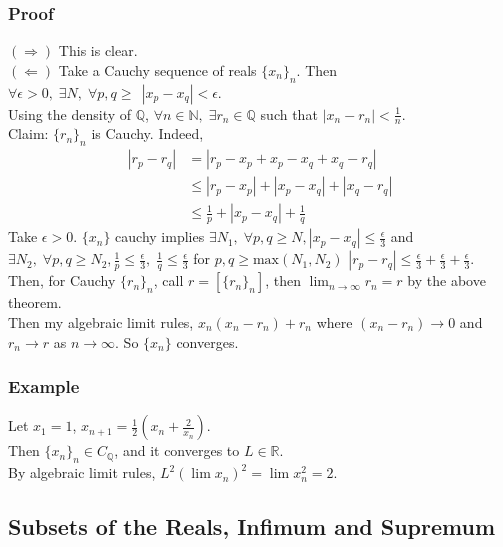 \documentclass[11pt]{article}
\newcommand{\0}{\emptyset}
\newcommand{\N}{\mathbb{N}}
\newcommand{\Q}{\mathbb{Q}}
\newcommand{\R}{\mathbb{R}}
\begin{document}
\subsubsection*{Proof}
\label{sec:org1667e9c}
\((\Longrightarrow)\) This is clear.\\[0pt]
\((\Longleftarrow)\) Take a Cauchy sequence of reals \(\{x_{n}\}_{n}\). Then \(\forall\epsilon>0,\;\exists N,\;\forall p,q\geq\,\;|x_{p}-x_{q}|<\epsilon\).\\[0pt]
Using the density of \(\Q\), \(\forall n\in\N,\;\exists r_{n}\in\Q\) such that \(|x_{n}-r_{n}|<\frac{1}{n}\).\\[0pt]
Claim: \(\{r_{n}\}_{n}\) is Cauchy. Indeed,\\[0pt]
\begin{align*}
  |r_{p}-r_{q}|
  &=|r_{p}-x_{p}+x_{p}-x_{q}+x_{q}-r_{q}|
  \\&\leq|r_{p}-x_{p}|+|x_{p}-x_{q}|+|x_{q}-r_{q}|
  \\&\leq\frac{1}{p} +|x_{p}-x_{q}|+\frac{1}{q}
\end{align*}
Take \(\epsilon>0\). \(\{x_{n}\}\) cauchy implies \(\exists N_{1},\;\forall p,q\geq N,|x_{p}-x_{q}|\leq\frac{\epsilon}{3}\) and \(\exists N_{2},\;\forall p,q\geq N_{2},\frac{1}{p}\leq\frac{\epsilon}{3},\;\frac{1}{q}\leq\frac{\epsilon}{3}\) for \(p,q\geq\text{max}(N_{1},N_{2})\) \(|r_{p}-r_{q}|\leq\frac{\epsilon}{3}+\frac{\epsilon}{3}+\frac{\epsilon}{3}\).\\[0pt]
Then, for Cauchy \(\{r_{n}\}_{n}\), call \(r=[\{r_{n}\}_{n}]\), then \(\lim_{n\to\infty}r_{n}=r\) by the above theorem.\\[0pt]
Then my algebraic limit rules, \(x_{n}(x_{n}-r_{n})+r_{n}\) where \((x_{n}-r_{n})\to 0\) and \(r_{n}\to r\) as \(n\to\infty\). So \(\{x_{n}\}\) converges.\\[0pt]
\subsubsection*{Example}
\label{sec:org79f2823}
Let \(x_{1}=1\), \(x_{n+1}=\frac{1}{2}(x_{n}+\frac{2}{x_{n}})\).\\[0pt]
Then \(\{x_{n}\}_{n}\in C_{\Q}\), and it converges to \(L\in\R\).\\[0pt]
By algebraic limit rules, \(L^{2}(\lim x_{n})^{2}=\lim x_{n}^{2}=2\).\\[0pt]
\subsection*{Subsets of the Reals, Infimum and Supremum}
\label{sec:org66e2c50}
\end{document}
